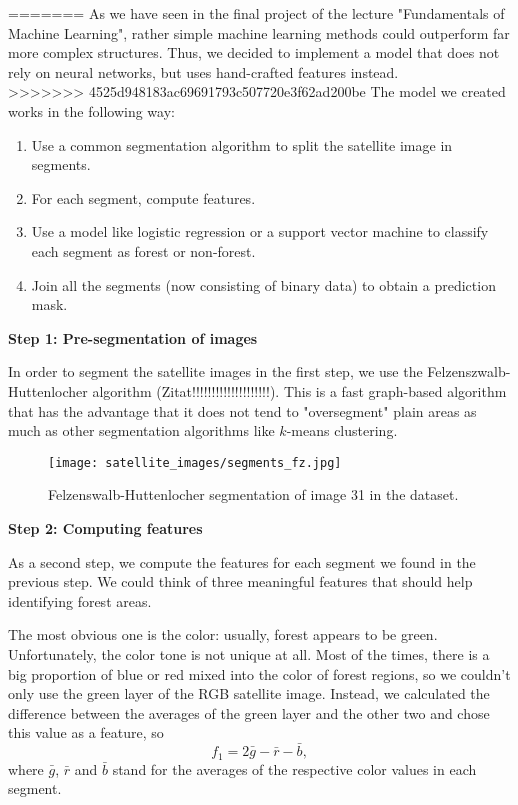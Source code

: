=======
As we have seen in the final project of the lecture "Fundamentals of Machine Learning", rather simple machine learning methods could outperform far more complex structures. Thus, we decided to implement a model that does not rely on neural networks, but uses hand-crafted features instead. \\
>>>>>>> 4525d948183ac69691793c507720e3f62ad200be
The model we created works in the following way:
\begin{enumerate}
	\item Use a common segmentation algorithm to split the satellite image in segments.
	\item For each segment, compute features.
	\item Use a model like logistic regression or a support vector machine to classify each segment as forest or non-forest.
	\item Join all the segments (now consisting of binary data) to obtain a prediction mask.
\end{enumerate}

\textbf{Step 1: Pre-segmentation of images}

In order to segment the satellite images in the first step, we use the Felzenszwalb-Huttenlocher algorithm (Zitat!!!!!!!!!!!!!!!!!!!!). This is a fast graph-based algorithm that has the advantage that it does not tend to "oversegment" plain areas as much as other segmentation algorithms like $k$-means clustering.

\begin{figure}[h]
	\centering
	\texttt{[image: satellite\_images/segments\_fz.jpg]}
	\caption{Felzenswalb-Huttenlocher segmentation of image 31 in the dataset.}
\end{figure}

\textbf{Step 2: Computing features}

As a second step, we compute the features for each segment we found in the previous step. We could think of three meaningful features that should help identifying forest areas. 

The most obvious one is the color: usually, forest appears to be green. Unfortunately, the color tone is not unique at all. Most of the times, there is a big proportion of blue or red mixed into the color of forest regions, so we couldn't only use the green layer of the RGB satellite image. Instead, we calculated the difference between the averages of the green layer and the other two and chose this value as a feature, so
\begin{equation}
	f_1=2\bar{g}-\bar{r}-\bar{b},
\end{equation}
where $\bar{g}$, $\bar{r}$ and $\bar{b}$ stand for the averages of the respective color values in each segment.

